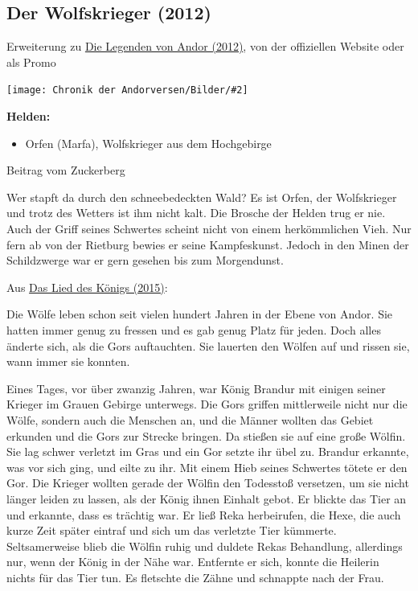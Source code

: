 \documentclass[10pt, a4paper, oneside]{book}
\newcommand{\fillbreak}{\vspace*{\fill}\columnbreak}
\newcommand{\produkt}[1]{%
    \section{#1}%
    \label{Produkt: #1}%
}
\newcommand{\refprodukt}[1]{\hyperref[Produkt: #1]{#1}}
\newcommand{\bildmitts}[2][height=0.32\textwidth,width=0.48\textwidth,keepaspectratio]{%
    \begin{center}
        \texttt{[image: Chronik der Andorversen/Bilder/\#2]}
    \end{center}
}
\begin{document}
\begin{multicols}{2}
\fillbreak
\produkt{Der Wolfskrieger (2012)}

\begin{center}
    Erweiterung zu \refprodukt{Die Legenden von Andor (2012)}, von der offiziellen Website oder als Promo
\end{center}

\bildmitts{Orfen.jpeg}

\textbf{Helden:} 
\begin{itemize}[topsep=0pt,itemsep=-1ex,partopsep=1ex,parsep=1ex]
    \item Orfen (Marfa), Wolfskrieger aus dem Hochgebirge
\end{itemize}

\begin{center}
    Beitrag vom Zuckerberg
\end{center}

Wer stapft da durch den schneebedeckten Wald? Es ist Orfen, der Wolfskrieger und trotz des Wetters ist ihm nicht kalt. Die Brosche der Helden trug er nie. Auch der Griff seines Schwertes scheint nicht von einem herkömmlichen Vieh. Nur fern ab von der Rietburg bewies er seine Kampfeskunst. Jedoch in den Minen der Schildzwerge war er gern gesehen bis zum Morgendunst.

\begin{center}
    Aus \refprodukt{Das Lied des Königs (2015)}:
\end{center}


Die Wölfe leben schon seit vielen hundert Jahren in der Ebene von Andor. Sie hatten immer genug zu fressen und es gab genug Platz für jeden. Doch alles änderte sich, als die Gors auftauchten. Sie lauerten den Wölfen auf und rissen sie, wann immer sie konnten.

Eines Tages, vor über zwanzig Jahren, war König Brandur mit einigen seiner Krieger im Grauen Gebirge unterwegs. Die Gors griffen mittlerweile nicht nur die Wölfe, sondern auch die Menschen an, und die Männer wollten das Gebiet erkunden und die Gors zur Strecke bringen. Da stießen sie auf eine große Wölfin. Sie lag schwer verletzt im Gras und ein Gor setzte ihr übel zu. Brandur erkannte, was vor sich ging, und eilte zu ihr. Mit einem Hieb seines Schwertes tötete er den Gor. Die Krieger wollten gerade der Wölfin den Todesstoß versetzen, um sie nicht länger leiden zu lassen, als der König ihnen Einhalt gebot. Er blickte das Tier an und erkannte, dass es trächtig war. Er ließ Reka herbeirufen, die Hexe, die auch kurze Zeit später eintraf und sich um das verletzte Tier kümmerte. Seltsamerweise blieb die Wölfin ruhig und duldete Rekas Behandlung, allerdings nur, wenn der König in der Nähe war. Entfernte er sich, konnte die Heilerin nichts für das Tier tun. Es fletschte die Zähne und schnappte nach der Frau.
    

\end{multicols}
\end{document}
